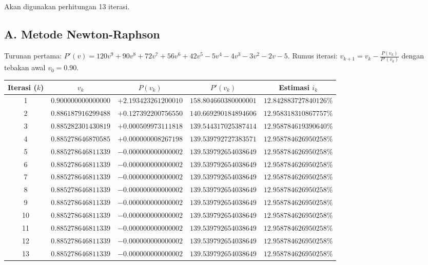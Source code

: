 \documentclass[11pt,a4paper]{article}
\begin{document}
Akan digunakan perhitungan 13 iterasi.

\subsection*{A. Metode Newton-Raphson}
Turunan pertama: $P'(v) = 120v^9 + 90v^8 + 72v^7 + 56v^6 + 42v^5 - 5v^4 - 4v^3 - 3v^2 - 2v - 5$.  
Rumus iterasi: $v_{k+1} = v_k - \frac{P(v_k)}{P'(v_k)}$ dengan tebakan awal $v_0 = 0.90$.

\begin{center}
\footnotesize
\setlength{\tabcolsep}{4pt}
\begin{tabular}{ccccc}
\toprule
\textbf{Iterasi ($k$)} & \textbf{$v_k$} & \textbf{$P(v_k)$} & \textbf{$P'(v_k)$} & \textbf{Estimasi $i_k$} \\
\midrule
1 & $0.900000000000000$ & $+2.193423261200010$ & $158.804660380000001$ & $12.842883727840126\%$ \\
2 & $0.886187916299488$ & $+0.127392200756550$ & $140.669290184894606$ & $12.958318310867757\%$ \\
3 & $0.885282301430819$ & $+0.000509973111818$ & $139.544317025387414$ & $12.958784619390640\%$ \\
4 & $0.885278646870585$ & $+0.000000008267198$ & $139.539792727383571$ & $12.958784626950258\%$ \\
5 & $0.885278646811339$ & $-0.000000000000002$ & $139.539792654038649$ & $12.958784626950258\%$ \\
6 & $0.885278646811339$ & $-0.000000000000002$ & $139.539792654038649$ & $12.958784626950258\%$ \\
7 & $0.885278646811339$ & $-0.000000000000002$ & $139.539792654038649$ & $12.958784626950258\%$ \\
8 & $0.885278646811339$ & $-0.000000000000002$ & $139.539792654038649$ & $12.958784626950258\%$ \\
9 & $0.885278646811339$ & $-0.000000000000002$ & $139.539792654038649$ & $12.958784626950258\%$ \\
10 & $0.885278646811339$ & $-0.000000000000002$ & $139.539792654038649$ & $12.958784626950258\%$ \\
11 & $0.885278646811339$ & $-0.000000000000002$ & $139.539792654038649$ & $12.958784626950258\%$ \\
12 & $0.885278646811339$ & $-0.000000000000002$ & $139.539792654038649$ & $12.958784626950258\%$ \\
13 & $0.885278646811339$ & $-0.000000000000002$ & $139.539792654038649$ & $\mathbf{12.958784626950258\%}$ \\
\bottomrule
\end{tabular}
\end{center}
\end{document}
